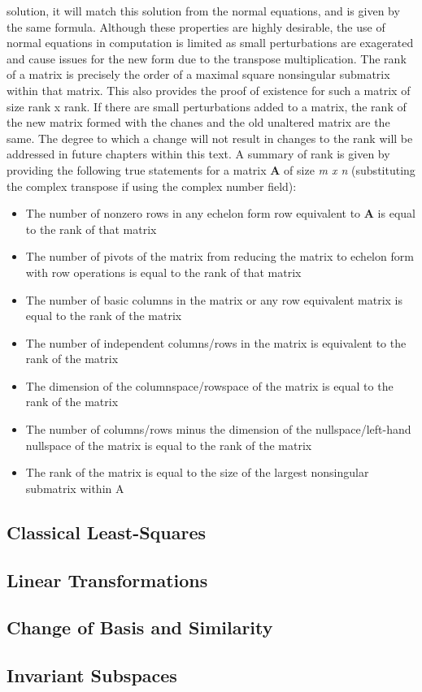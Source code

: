 \documentclass[12pt]{article}
\begin{document}
solution, it will match this solution from the normal equations, and is given by the same formula. Although these properties are highly desirable, the use of normal equations in computation 
is limited as small perturbations are exagerated and cause issues for the new form due to the transpose multiplication. 
\newline
\newline
The rank of a matrix is precisely the order of a maximal square nonsingular submatrix within that matrix. This also provides the proof of existence for such a matrix of size rank x rank. If 
there are small perturbations added to a matrix, the rank of the new matrix formed with the chanes and the old unaltered matrix are the same. The degree to which a change will not result in 
changes to the rank will be addressed in future chapters within this text. 
\newline
\newline
A summary of rank is given by providing the following true statements for a matrix \textbf{A} of size \textit{m x n} (substituting the complex transpose if using the complex number field):
\begin{itemize}
    \item The number of nonzero rows in any echelon form row equivalent to \textbf{A} is equal to the rank of that matrix
    \item The number of pivots of the matrix from reducing the matrix to echelon form with row operations is equal to the rank of that matrix
    \item The number of basic columns in the matrix or any row equivalent matrix is equal to the rank of the matrix
    \item The number of independent columns/rows in the matrix is equivalent to the rank of the matrix
    \item The dimension of the columnspace/rowspace of the matrix is equal to the rank of the matrix
    \item The number of columns/rows minus the dimension of the nullspace/left-hand nullspace of the matrix is equal to the rank of the matrix
    \item The rank of the matrix is equal to the size of the largest nonsingular submatrix within A
\end{itemize}
\subsection{Classical Least-Squares}
\subsection{Linear Transformations}
\subsection{Change of Basis and Similarity}
\subsection{Invariant Subspaces}
\end{document}
